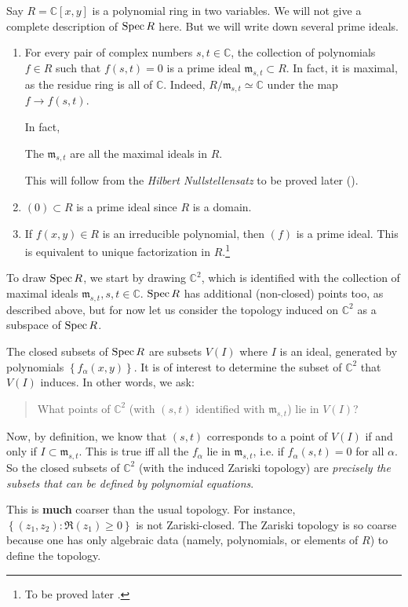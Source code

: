 \begin{example} \label{twovarpoly}
Say $R = \mathbb{C}[x,y]$ is a polynomial ring in two variables.
We will not give a complete description of $\operatorname{Spec} R$ here. But we will write
down several
prime ideals.

\begin{enumerate}
\item For every pair of complex numbers $s,t \in \mathbb{C}$,
the collection of polynomials
$f \in R$ such that $f(s,t) = 0$ is a prime ideal $\mathfrak{m}
_{s,t} \subset R$. In
fact, it is maximal, as the residue ring is all of
$\mathbb{C}$. Indeed,
$R/\mathfrak{m}_{s,t} \simeq \mathbb{C}$ under the map $f \to
f(s,t)$.

In fact, 
\begin{theorem}
The $\mathfrak{m}_{s,t}$ are all the maximal ideals in $R$.
\end{theorem} 
This will follow from the \emph{Hilbert Nullstellensatz} to be
proved later
().
\item $(0) \subset R$ is a prime ideal since $R$ is a domain. 
\item If $f(x,y) \in R$ is an irreducible polynomial, then $(f)$
is a prime
ideal. This is equivalent to unique factorization in
$R$.\footnote{To be
proved later \rref{}.}  
\end{enumerate}

To draw $\operatorname{Spec} R$, we start by drawing $\mathbb{C}^2$, which is identified
with the
collection of
maximal ideals $\mathfrak{m}_{s,t}, s, t \in \mathbb{C}$. $\operatorname{Spec} R$ has
additional (non-closed) points
too, as
described above, but for now let us
consider the topology induced on $\mathbb{C}^2$ as a subspace of
$\operatorname{Spec} R$.

The closed subsets of $\operatorname{Spec} R$ are subsets $V(I)$ where $I$ is
an ideal,
generated by polynomials $\left\{f_{\alpha}(x,y)\right\}$. It is of interest to
determine the subset of $\mathbb{C}^2$ that
$V(I)$
induces. In other words, we ask:
\begin{quote}
What points of $\mathbb{C}^2$ (with $(s,t)$ identified with
$\mathfrak{m}_{s,t}$) lie in $V(I)$?
\end{quote}
Now, by definition, we know that $(s,t)$ corresponds to a point of $V(I)$ if
and only if $I
\subset \mathfrak{m}_{s,t}$.
This is true iff all the
$f_{\alpha} $ lie in $ \mathfrak{m}_{s,t}$, i.e. if
$f_{\alpha}(s,t) =0$ for all
$\alpha$. So the closed subsets of $\mathbb{C}^2$ (with the
induced Zariski
topology) are \emph{precisely the subsets
that can be defined by polynomial equations}.

This is
\textbf{much} coarser
than the usual topology. For instance, $\left\{(z_1,z_2):
\Re(z_1) \geq 0\right\}$ is
not Zariski-closed. 
The Zariski topology is so coarse because one has only algebraic
data (namely,
polynomials, or elements of $R$) to define the topology.
\end{example} 

